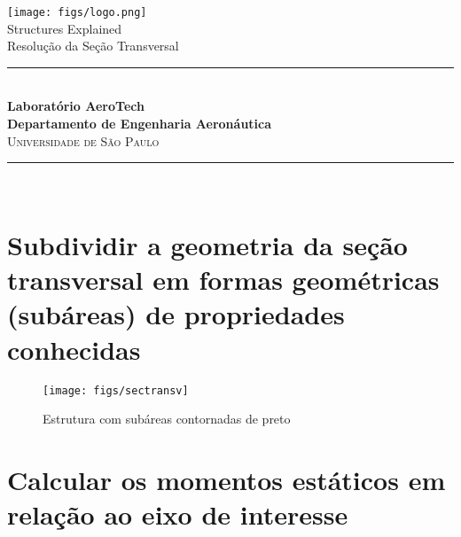 \documentclass[a4paper,12pt]{article}%
\begin{document}
%
\normalsize%

            \begin{titlepage}
            
            \newcommand{\HRule}{\rule{\linewidth}{0.5mm}}
            
            \center
            
            \texttt{[image: figs/logo.png]}\\[1cm]
            \vspace{\fill}
            {\LARGE Structures Explained\\ Resolução da Seção Transversal}\\[1.5cm]
            
            \HRule \\[0.6cm]
            
                 \large\textbf{Laboratório AeroTech}\\[0.5cm]
                 \large\textbf{Departamento de Engenharia Aeronáutica}\\[0.5cm]
                 \textsc{\Large Universidade de São Paulo}\\[0.5cm]
                 
             \HRule \\[1.5cm]            
            
             \vfill
        
             \end{titlepage}
        
             \newpage
\section{Subdividir a geometria da seção transversal em formas geométricas (subáreas) de propriedades conhecidas}%
\label{sec:Subdividirageometriadaseotransversalemformasgeomtricas(subreas)depropriedadesconhecidas}%


\begin{figure}[H]%
\centering%
\texttt{[image: figs/sectransv]}%
\caption{\label{fig:estrutura} Estrutura com subáreas contornadas de preto}%
\end{figure}

%
\section{Calcular os momentos estáticos em relação ao eixo de interesse}%
\label{sec:Calcularosmomentosestticosemrelaoaoeixodeinteresse}%
\end{document}
